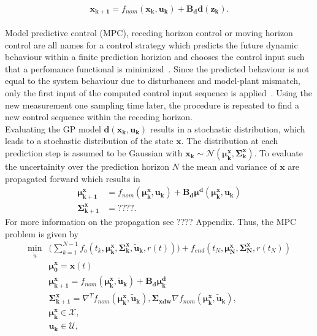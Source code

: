 \documentclass[letterpaper, 10 pt, conference]{ieeeconf}  %
\begin{document}
\begin{equation}
\boldsymbol{x_{k+1}} = f_{nom}(\boldsymbol{x_k},\boldsymbol{u_k}) + \boldsymbol{B_d} \boldsymbol{d}(\boldsymbol{z_k}).
\end{equation}
 \\
Model predictive control (MPC), receding  horizon  control or moving horizon control are all names for a control strategy which predicts the future dynamic behaviour within a finite prediction horizion and chooses the control input such that a perfomance functional is minimized~\cite{allgeowernonlinear}. Since the predicted behaviour is not equal to the system behaviour due to disturbances and model-plant mismatch, only the first input of the computed control input sequence is applied~\cite{allgeowernonlinear}. Using the new measurement one sampling time later, the procedure is repeated to find a new control sequence within the receding horizon.\\
Evaluating the GP model $\boldsymbol{d}(\boldsymbol{x_k},\boldsymbol{u_k})$ results in a stochastic distribution, which leads to a stochastic distribution of the state $\boldsymbol{x}$. The distribution at each prediction step is assumed to be Gaussian with $\boldsymbol{x_k} \sim \mathcal{N}(\boldsymbol{\mu^x_k},\boldsymbol{\Sigma^x_k})$. To evaluate the uncertainity over the prediction horizon $N$ the mean and variance of $\boldsymbol{x}$ are propagated forward which results in
\begin{align}
\boldsymbol{\mu^x_{k+1}}&= f_{nom}(\boldsymbol{\mu^x_k},\boldsymbol{u_k})+\boldsymbol{B_d} \boldsymbol{\mu^d}(\boldsymbol{\mu^x_k},\boldsymbol{u_k})\\
\boldsymbol{\Sigma^x_{k+1}} &= ????.
\end{align}
For more information on the propagation see ???? Appendix.
Thus, the MPC problem is given by
\begin{align}
\min_{\tilde{u}} &\big(\sum_{k=1}^{N-1} f_o(t_k,\boldsymbol{\mu^x_k},\boldsymbol{\Sigma^x_k},\boldsymbol{\tilde{u}_k},r(t))\big) + f_{end}(t_N,\boldsymbol{\mu^x_N},\boldsymbol{\Sigma^x_N},r(t_N))\\
&\boldsymbol{\mu^x_0} = \boldsymbol{x}(t)\\
&\boldsymbol{\mu^x_{k+1}}= f_{nom}(\boldsymbol{\mu^x_k},\boldsymbol{\tilde{u}_k})+\boldsymbol{B_d} \boldsymbol{\mu^d_k}\\
&\boldsymbol{\Sigma^x_{k+1}}=\nabla^T  f_{nom}(\boldsymbol{\mu^x_k},\boldsymbol{\tilde{u}_k}),\boldsymbol{\Sigma_{xdw}} \nabla f_{nom}(\boldsymbol{\mu^x_k},\boldsymbol{\tilde{u}_k}),\\
&\boldsymbol{\mu^x_k} \in \mathcal{X},\\
&\boldsymbol{u_k} \in \mathcal{U},
\end{align}
\end{document}
